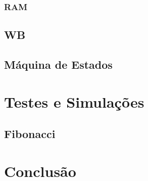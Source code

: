 \documentclass[a4paper]{article}
\begin{document}
			\subsubsection{RAM}
			
		\subsection{WB}
		
		\subsection{Máquina de Estados}
		
	\section{Testes e Simulações}
	
		\subsection{Fibonacci}
		
	\section{Conclusão}
	
\end{document}
